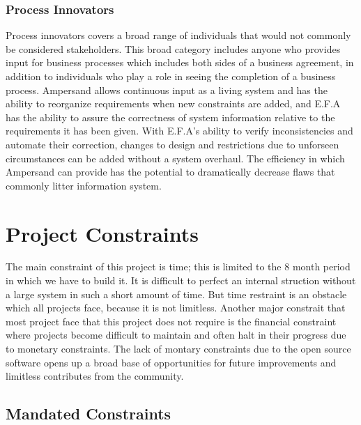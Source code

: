 \documentclass[12pt]{report}
\begin{document}
\subsection{Process Innovators}
Process innovators covers a broad range of individuals that would not commonly 
be considered stakeholders. This broad category includes anyone who provides 
input for business processes which includes both sides of a business agreement, 
in addition to individuals who play a role in seeing the completion of a 
business process. Ampersand allows continuous input as a living system and has 
the ability to reorganize requirements when new constraints are added, and 
E.F.A has the ability to assure the correctness of system information relative 
to the requirements it has been given. With E.F.A's ability to verify 
inconsistencies and automate their correction, changes to design and 
restrictions due to unforseen circumstances can be added without a system 
overhaul. The efficiency in which Ampersand can provide has the potential to 
dramatically decrease flaws that commonly litter information system.

\chapter{Project Constraints}\label{ch:Constraints}
The main constraint of this project is time; this is limited to the 8 month 
period in which we have to build it. It is difficult to perfect an internal 
struction without a large system in such a short amount of time. But time 
restraint is an obstacle which all projects face, because it is not limitless. 
Another major constrait that most project face that this project does not 
require is the financial constraint where projects become difficult to maintain 
and often halt in their progress due to monetary constraints. The lack of 
montary constraints due to the open source software opens up a broad base of 
opportunities for future improvements and limitless contributes from the 
community.
\section{Mandated Constraints}\label{sec:Constraints}
\end{document}
